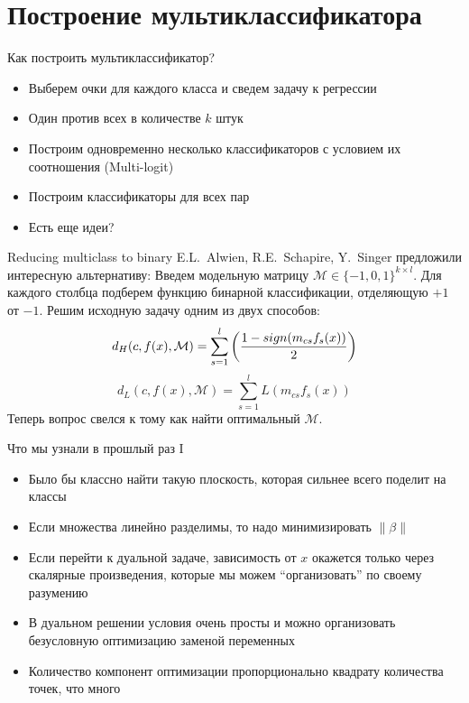 \documentclass[14pt, fleqn, xcolor={dvipsnames, table}]{beamer}
\begin{document}
\section{Построение мультиклассификатора} %
\begin{frame}{Как построить мультиклассификатор?}
\begin{itemize}
  \item Выберем очки для каждого класса и сведем задачу к регрессии
  \item Один против всех в количестве $k$ штук
  \item Построим одновременно несколько классификаторов с условием их соотношения (Multi-logit)
  \item Построим классификаторы для всех пар
  \item Есть еще идеи?
\end{itemize}
\end{frame}

\begin{frame}{Reducing multiclass to binary}
\small
E.L.~Alwien, R.E.~Schapire, Y.~Singer предложили интересную альтернативу:
Введем модельную матрицу $\mathcal{M} \in \{-1,0,1\}^{k\times l}$. Для каждого столбца подберем функцию бинарной классификации, отделяющую $+1$ от $-1$.
Решим исходную задачу одним из двух способов:
$$
d_H(c, f(x), \mathcal{M}) = \sum_{s = 1}^l\left({1 - sign(m_{cs} f_s(x)) \over 2}\right)
$$
$$
d_L(c, f(x), \mathcal{M}) = \sum_{s = 1}^l L(m_{cs} f_s(x))
$$
Теперь вопрос свелся к тому как найти оптимальный $\mathcal{M}$.
\end{frame}

\begin{frame}{Что мы узнали в прошлый раз I}
\small
\begin{itemize}
  \item Было бы классно найти такую плоскость, которая сильнее всего поделит на классы
  \item Если множества линейно разделимы, то надо минимизировать $\|\beta\|$
  \item Если перейти к дуальной задаче, зависимость от $x$ окажется только через скалярные произведения, которые мы можем ``организовать'' по своему разумению
  \item В дуальном решении условия очень просты и можно организовать безусловную оптимизацию заменой переменных
  \item Количество компонент оптимизации пропорционально квадрату количества точек, что много
\end{itemize}
\end{frame}
\end{document}
